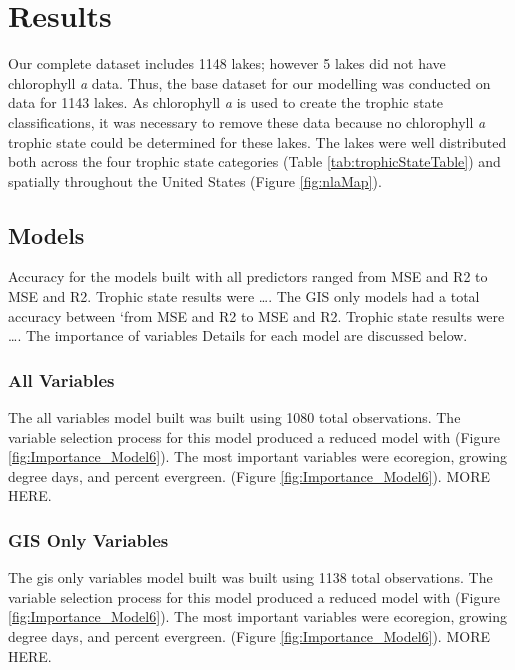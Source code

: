 \documentclass[11pt,]{article}
\begin{document}
\section{Results}\label{results}

Our complete dataset includes 1148 lakes; however 5 lakes did not have
chlorophyll \emph{a} data. Thus, the base dataset for our modelling was
conducted on data for 1143 lakes. As chlorophyll \emph{a} is used to
create the trophic state classifications, it was necessary to remove
these data because no chlorophyll \emph{a} trophic state could be
determined for these lakes. The lakes were well distributed both across
the four trophic state categories (Table \ref{tab:trophicStateTable})
and spatially throughout the United States (Figure \ref{fig:nlaMap}).

\subsection{Models}\label{models}

Accuracy for the models built with all predictors ranged from MSE and R2
to MSE and R2. Trophic state results were \ldots{}. The GIS only models
had a total accuracy between `from MSE and R2 to MSE and R2. Trophic
state results were \ldots{}. The importance of variables Details for
each model are discussed below.

\subsubsection{All Variables}\label{all-variables}

The all variables model built was built using 1080 total observations.
The variable selection process for this model produced a reduced model
with (Figure \ref{fig:Importance_Model6}). The most important variables
were ecoregion, growing degree days, and percent evergreen. (Figure
\ref{fig:Importance_Model6}). MORE HERE.

\subsubsection{GIS Only Variables}\label{gis-only-variables}

The gis only variables model built was built using 1138 total
observations. The variable selection process for this model produced a
reduced model with (Figure \ref{fig:Importance_Model6}). The most
important variables were ecoregion, growing degree days, and percent
evergreen. (Figure \ref{fig:Importance_Model6}). MORE HERE.
\end{document}
